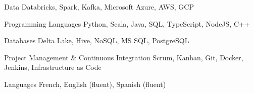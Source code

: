 \begin{cvskills}

	\cvskill
	{Data}
	{Databricks, Spark, Kafka, Microsoft Azure, AWS, GCP}
	
	\cvskill
	{Programming Languages}
	{Python, Scala, Java, SQL, TypeScript, NodeJS, C++}
	
	\cvskill
	{Databases}
	{Delta Lake, Hive, NoSQL, MS SQL, PostgreSQL}
	
	\cvskill
	{Project Management \& Continuous Integration}
	{Scrum, Kanban, Git, Docker, Jenkins, Infrastructure as Code}
	
	\cvskill
	{Languages}
	{French, English (fluent), Spanish (fluent)}
	
\end{cvskills}